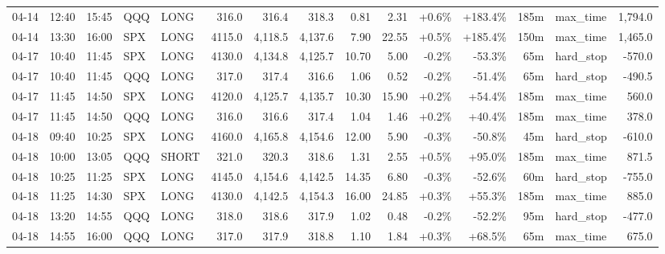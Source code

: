 \documentclass[11pt,a4paper,twoside]{article}
\begin{document}
\begin{landscape}
\begin{center}
\begin{longtable}{>{\color{txtmain}}l l l l l r r r r r r r r >{\color{txtmain}}l r}
04-14 & 12:40 & 15:45 & QQQ & LONG & 316.0 & 316.4 & 318.3 & 0.81 & 2.31 & \textcolor{wingreen}{+0.6\%} & \textcolor{wingreen}{+183.4\%} & 185m & max\_time & \textcolor{wingreen}{1,794.0} \\
04-14 & 13:30 & 16:00 & SPX & LONG & 4115.0 & 4,118.5 & 4,137.6 & 7.90 & 22.55 & \textcolor{wingreen}{+0.5\%} & \textcolor{wingreen}{+185.4\%} & 150m & max\_time & \textcolor{wingreen}{1,465.0} \\
04-17 & 10:40 & 11:45 & SPX & LONG & 4130.0 & 4,134.8 & 4,125.7 & 10.70 & 5.00 & \textcolor{lossred}{-0.2\%} & \textcolor{lossred}{-53.3\%} & 65m & hard\_stop & \textcolor{lossred}{-570.0} \\
04-17 & 10:40 & 11:45 & QQQ & LONG & 317.0 & 317.4 & 316.6 & 1.06 & 0.52 & \textcolor{lossred}{-0.2\%} & \textcolor{lossred}{-51.4\%} & 65m & hard\_stop & \textcolor{lossred}{-490.5} \\
04-17 & 11:45 & 14:50 & SPX & LONG & 4120.0 & 4,125.7 & 4,135.7 & 10.30 & 15.90 & \textcolor{wingreen}{+0.2\%} & \textcolor{wingreen}{+54.4\%} & 185m & max\_time & \textcolor{wingreen}{560.0} \\
04-17 & 11:45 & 14:50 & QQQ & LONG & 316.0 & 316.6 & 317.4 & 1.04 & 1.46 & \textcolor{wingreen}{+0.2\%} & \textcolor{wingreen}{+40.4\%} & 185m & max\_time & \textcolor{wingreen}{378.0} \\
04-18 & 09:40 & 10:25 & SPX & LONG & 4160.0 & 4,165.8 & 4,154.6 & 12.00 & 5.90 & \textcolor{lossred}{-0.3\%} & \textcolor{lossred}{-50.8\%} & 45m & hard\_stop & \textcolor{lossred}{-610.0} \\
04-18 & 10:00 & 13:05 & QQQ & SHORT & 321.0 & 320.3 & 318.6 & 1.31 & 2.55 & \textcolor{wingreen}{+0.5\%} & \textcolor{wingreen}{+95.0\%} & 185m & max\_time & \textcolor{wingreen}{871.5} \\
04-18 & 10:25 & 11:25 & SPX & LONG & 4145.0 & 4,154.6 & 4,142.5 & 14.35 & 6.80 & \textcolor{lossred}{-0.3\%} & \textcolor{lossred}{-52.6\%} & 60m & hard\_stop & \textcolor{lossred}{-755.0} \\
04-18 & 11:25 & 14:30 & SPX & LONG & 4130.0 & 4,142.5 & 4,154.3 & 16.00 & 24.85 & \textcolor{wingreen}{+0.3\%} & \textcolor{wingreen}{+55.3\%} & 185m & max\_time & \textcolor{wingreen}{885.0} \\
04-18 & 13:20 & 14:55 & QQQ & LONG & 318.0 & 318.6 & 317.9 & 1.02 & 0.48 & \textcolor{lossred}{-0.2\%} & \textcolor{lossred}{-52.2\%} & 95m & hard\_stop & \textcolor{lossred}{-477.0} \\
04-18 & 14:55 & 16:00 & QQQ & LONG & 317.0 & 317.9 & 318.8 & 1.10 & 1.84 & \textcolor{wingreen}{+0.3\%} & \textcolor{wingreen}{+68.5\%} & 65m & max\_time & \textcolor{wingreen}{675.0} \\

\end{longtable}
\end{center}
\end{landscape}
\end{document}
